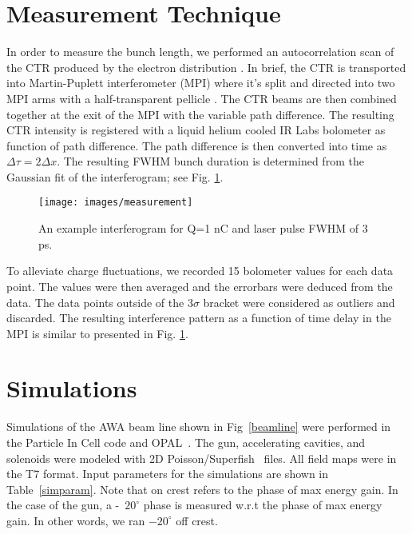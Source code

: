 \documentclass[letterpaper,  %
              ]{jacow-2_3}   %
\begin{document}
\section{Measurement Technique}
In order to measure the bunch length, we performed an autocorrelation scan
of the CTR produced by the electron distribution \cite{Happek, WBarry}.
In brief, the CTR is transported into Martin-Puplett interferometer (MPI)
where it's split and directed into two MPI arms with a half-transparent pellicle \cite{PhysRevSTAB.9.082801}. 
The CTR beams are then combined together at the exit of the MPI with the variable path difference.
The resulting CTR intensity is registered with a liquid helium cooled IR Labs
bolometer \cite{IRlabs} as function of path difference.
The path difference is then converted into time as $\Delta \tau = 2 \Delta x$.
The resulting FWHM bunch duration is determined from the Gaussian fit of 
the interferogram; see Fig. \ref{interferogram}.
\begin{figure}
 \texttt{[image: images/measurement]}
 \caption{An example interferogram for Q=1 nC and laser pulse FWHM of 3 ps.}
 \label{interferogram}
\end{figure}
To alleviate charge fluctuations, we recorded 15 bolometer values for each data point.
The values were then averaged and the errorbars were deduced from the data. The data points
outside of the 3$\sigma$ bracket were considered as outliers and discarded. The resulting
interference pattern as a function of time delay in the MPI is similar to presented in Fig. \ref{interferogram}.

\section{Simulations}
Simulations of the AWA beam line shown in Fig~\ref{beamline}
were performed in the Particle In Cell code and OPAL~\cite{opal}.
The gun, accelerating cavities, and solenoids were modeled with 2D
Poisson/Superfish~\cite{fish} files. All field maps were in the T7 format.
Input parameters for the simulations are shown in Table~\ref{simparam}.
Note that on crest refers to the phase of max energy gain.
In the case of the gun, a -~$20^{\circ}$ phase is measured 
w.r.t the phase of max energy gain. 
In other words, we ran $-20^{\circ}$ off crest.
\begin{figure*}[!tbh]
	\centering
	\begin{tikzpicture}[scale=1.0, text=black]
	
	\end{tikzpicture}	
	\caption{Beam line layout at the AWA.}
	\label{beamline}
\end{figure*}
\end{document}
